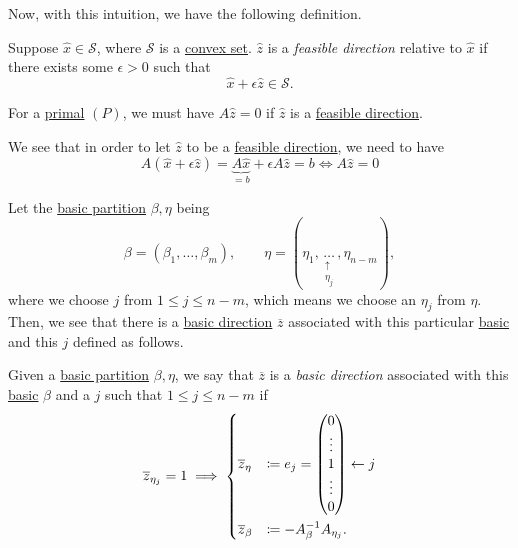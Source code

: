 Now, with this intuition, we have the following definition.
\begin{definition}\label{def:feasible-direction}
	Suppose \(\hat{x}\in \mathcal{S}\), where \(\mathcal{S}\) is a \hyperref[def:convex-set]{convex set}.
	\(\hat{z}\) is a \emph{feasible direction} relative to \(\hat{x}\) if there exists some \(\epsilon>0\) such that
	\[
		\hat{x}+\epsilon \hat{z} \in \mathcal{S}.
	\]
	\begin{center}
	\end{center}
\end{definition}

\begin{remark}
	For a \hyperref[def:primal]{primal} \((P)\), we must have \(A \hat{z} = 0\) if \(\hat{z}\) is a \hyperref[def:feasible-direction]{feasible direction}.
\end{remark}
\begin{explanation}
	We see that in order to let \(\hat{z}\) to be a \hyperref[def:feasible-direction]{feasible direction}, we need to have
	\[
		A(\hat{x} + \epsilon \hat{z}) = \underbrace{A \hat{x}}_{=b} + \epsilon A \hat{z} = b \iff A \hat{z} = 0
	\]
\end{explanation}

Let the \hyperref[def:basic-partition]{basic partition} \(\beta, \eta\) being
\[
	\beta = (\beta_1, \ldots , \beta_m), \qquad \eta = (\eta_1, \underset{\substack{\uparrow \\ \eta_j}}{\ldots} , \eta_{n-m}),
\]
where we choose \(j\) from \(1\leq j \leq n-m\), which means we choose an \(\eta_j\) from \(\eta\). Then, we see that there is a \hyperref[def:basic-direction]{basic direction}
\(\overline{z}\) associated with this particular \hyperref[def:basic]{basic} and this \(j\) defined as follows.

\begin{definition}\label{def:basic-direction}
	Given a \hyperref[def:basic-partition]{basic partition} \(\beta, \eta\), we say that \(\overline{z}\) is a \emph{basic direction} associated with this \hyperref[def:basic]{basic} \(\beta\)
	and a \(j\) such that \(1 \leq j \leq n-m\) if
	\[
		\overline{z}_{\eta_j} = 1 \implies \begin{dcases}
			\overline{z}_{\eta}  & \coloneqq e_j = \begin{pmatrix}
				                                       0      \\
				                                       \vdots \\
				                                       1      \\
				                                       \vdots \\
				                                       0      \\
			                                       \end{pmatrix}\leftarrow j \\
			\overline{z}_{\beta} & \coloneqq -A^{-1}_{\beta}A_{\eta_j}.
		\end{dcases}
	\]
\end{definition}

